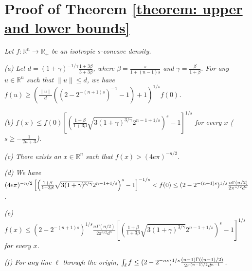 \documentclass[11pt]{article}
\newcommand{\R}{\mathbb{R}}
\newcommand{\red}[1]{{\color{black}#1}}
\begin{document}
{{{{\section{Proof of Theorem \ref{theorem: upper and lower bounds}}
\label{section: proof of upper and lower bound}

\emph{Let $f:\R^n\rightarrow\R_+$ be an isotropic $s$-concave density.}

\emph{
(a) Let $d=(1+\gamma)^{-1/\gamma}\frac{1+3\beta}{3+3\beta}$, where $\beta=\frac{s}{1+(n-1)s}$ and $\gamma=\frac{\beta}{1+\beta}$. For any $u\in\R^n$ such that $\|u\|\le d$, we have \red{$f(u)\ge \left(\frac{\|u\|}{d}((2-2^{-(n+1)s})^{-1}-1)+1\right)^{1/s}f(0)$}.}

\emph{
(b) $f(x)\le f(0)\left[\left(\frac{1+\beta}{1+3\beta}\sqrt{3(1+\gamma)^{3/\gamma}}2^{n-1+1/s}\right)^{s}-1\right]^{1/s}$ for every $x$ ($s\ge -\frac{1}{2n+3}$).}

\emph{
(c) There exists an $x\in\R^n$ such that $f(x)>(4e\pi)^{-n/2}$.}

\emph{
(d) We have $(4e\pi)^{-n/2}\left[\left(\frac{1+\beta}{1+3\beta}\sqrt{3(1+\gamma)^{3/\gamma}}2^{n-1+1/s}\right)^{s}-1\right]^{-1/s}<f(0)\le \red{(2-2^{-(n+1)s})^{1/s}\frac{n\Gamma(n/2)}{2\pi^{n/2}d^n}}$.}

\emph{
(e) \red{$f(x)\le (2-2^{-(n+1)s})^{1/s}\frac{n\Gamma(n/2)}{2\pi^{n/2}d^n}\left[\left(\frac{1+\beta}{1+3\beta}\sqrt{3(1+\gamma)^{3/\gamma}}2^{n-1+1/s}\right)^{s}-1\right]^{1/s}$} for every $x$.}

\emph{
(f) For any line $\ell$ through the origin, $\int_{\ell} f \le \red{(2-2^{-ns})^{1/s}\frac{(n-1)\Gamma((n-1)/2)}{2\pi^{(n-1)/2}d^{n-1}}}$.}

}}}}
\end{document}
